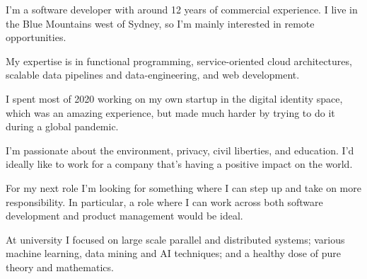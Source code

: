 


\begin{cvletter}
  I’m a software developer with around 12 years of commercial experience. I live in the Blue Mountains west of Sydney, so I'm mainly interested in remote opportunities.

  My expertise is in functional programming, service-oriented cloud architectures, scalable data pipelines and data-engineering, and web development.

  I spent most of 2020 working on my own startup in the digital identity space, which was an amazing experience, but made much harder by trying to do it during a global pandemic.

  I'm passionate about the environment, privacy, civil liberties, and education. I'd ideally like to work for a company that's having a positive impact on the world.

  For my next role I'm looking for something where I can step up and take on more responsibility. In particular, a role where I can work across both software development and product management would be ideal.

  At university I focused on large scale parallel and distributed systems; various machine learning, data mining and AI techniques; and a healthy dose of pure theory and mathematics.
\end{cvletter}